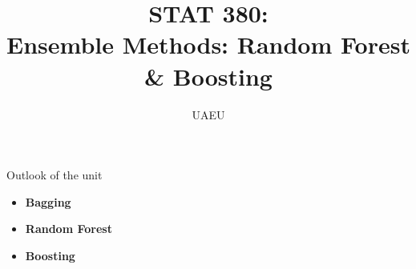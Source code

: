 \documentclass[compress]{beamer}
\title{  STAT 380:\\ {\color{black}  Ensemble Methods: Random Forest \& Boosting  }}
\author[UAEU]
{UAEU}
\institute[UAEU] %
{
  \inst{}%
  \vspace{0.1in}

  
}
\date{}
\newcommand{\sqBullet}[1]{  {\tiny \tiny \tiny \qBoxCol{#1!60}{ }} }
\begin{document}
\maketitle





\begin{frame}{Outlook of the unit}
	
	\begin{itemize}
		\item \textbf{Bagging}
		\item \textbf{Random Forest}
		\item \textbf{Boosting}
		\end{itemize}		
\end{frame}


%
%	
%	
%		


%
%
\end{document}
